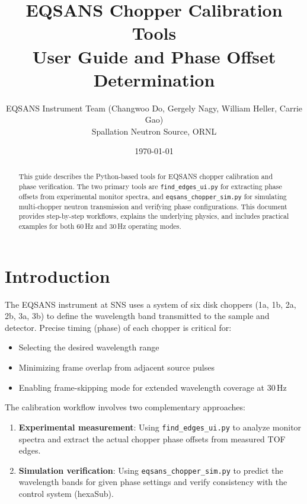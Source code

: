 \documentclass[11pt,letterpaper]{article}
\title{EQSANS Chopper Calibration Tools\\[0.5em]
\large User Guide and Phase Offset Determination}
\author{EQSANS Instrument Team (Changwoo Do, Gergely Nagy, William Heller, Carrie Gao) \\Spallation Neutron Source, ORNL}
\date{\today}
\begin{document}
\maketitle

\begin{abstract}
This guide describes the Python-based tools for EQSANS chopper calibration and phase verification. 
The two primary tools are \texttt{find\_edges\_ui.py} for extracting phase offsets from experimental 
monitor spectra, and \texttt{eqsans\_chopper\_sim.py} for simulating multi-chopper neutron transmission 
and verifying phase configurations. This document provides step-by-step workflows, explains the 
underlying physics, and includes practical examples for both 60\,Hz and 30\,Hz operating modes.
\end{abstract}

\tableofcontents
\newpage

\section{Introduction}

The EQSANS instrument at SNS uses a system of six disk choppers (1a, 1b, 2a, 2b, 3a, 3b) to define 
the wavelength band transmitted to the sample and detector. Precise timing (phase) of each chopper 
is critical for:
\begin{itemize}
    \item Selecting the desired wavelength range
    \item Minimizing frame overlap from adjacent source pulses
    \item Enabling frame-skipping mode for extended wavelength coverage at 30\,Hz
\end{itemize}

The calibration workflow involves two complementary approaches:
\begin{enumerate}
    \item \textbf{Experimental measurement}: Using \texttt{find\_edges\_ui.py} to analyze monitor 
    spectra and extract the actual chopper phase offsets from measured TOF edges.
    \item \textbf{Simulation verification}: Using \texttt{eqsans\_chopper\_sim.py} to predict the 
    wavelength bands for given phase settings and verify consistency with the control system 
    (hexaSub).
\end{enumerate}
\end{document}
